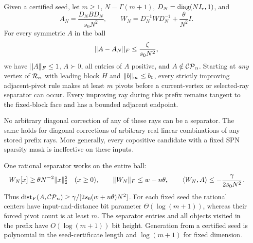 \begin{theorem}\label{thm:amplification}
Given a certified seed, let $m\ge1$, $N=\Gamma(m+1)$, $D_N=\operatorname{diag}(NI_r,1)$, and
\[
 A_N=\frac{D_NBD_N}{s_0N^2},\qquad
 W_N=D_N^{-1}WD_N^{-1}+\frac\theta{N^2}I.
\]
For every symmetric $A$ in the ball
\begin{equation}\label{eq:ball}
 \lVert A-A_N\rVert_F\le\frac\zeta{s_0N^2},
\end{equation}
we have $\lVert A\rVert_F\le1$, $A\succ0$, all entries of $A$ positive, and $A\notin\mathcal{CP}_n$. Starting at \emph{any} vertex of $\mathcal R_n$ with leading block $H$ and $\lVert b\rVert_\infty\le b_0$, every strictly improving adjacent-pivot rule makes at least $m$ pivots before a current-vertex or selected-ray separator can occur. Every improving ray during this prefix remains tangent to the fixed-block face and has a bounded adjacent endpoint.

No arbitrary diagonal correction of any of these rays can be a separator. The same holds for diagonal corrections of arbitrary real linear combinations of any stored prefix rays. More generally, every copositive candidate with a fixed SPN sparsity mask is ineffective on these inputs.

One rational separator works on the entire ball:
\[
 W_N[x]\ge\theta N^{-2}\lVert x\rVert_2^2\quad(x\ge0),\qquad
 \lVert W_N\rVert_F\le w+n\theta,\qquad
 \langle W_N,A\rangle\le-\frac\gamma{2s_0N^2}.
\]
Thus $\operatorname{dist}_F(A,\mathcal{CP}_n)\ge\gamma/[2s_0(w+n\theta)N^2]$. For each fixed seed the rational centers have input-and-distance bit parameter $\Theta(\log(m+1))$, whereas their forced pivot count is at least $m$. The separator entries and all objects visited in the prefix have $O(\log(m+1))$ bit height. Generation from a certified seed is polynomial in the seed-certificate length and $\log(m+1)$ for fixed dimension.
\end{theorem}

